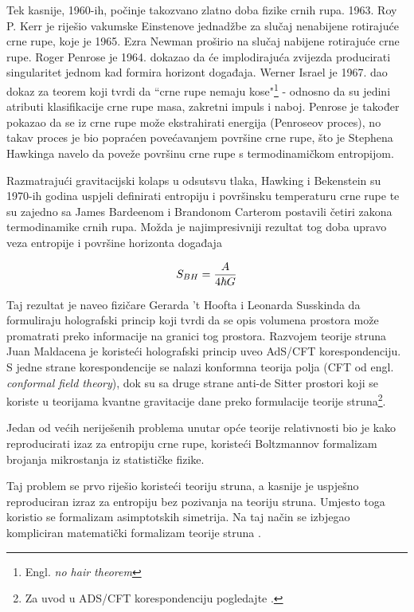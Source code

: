 Tek kasnije, 1960-ih, počinje takozvano zlatno doba fizike crnih rupa. 1963. Roy P. Kerr je riješio vakumske Einstenove jednadžbe za slučaj nenabijene rotirajuće crne rupe, koje je 1965. Ezra Newman proširio na slučaj nabijene rotirajuće crne rupe. Roger Penrose je  1964. dokazao da će implodirajuća zvijezda producirati singularitet jednom kad formira horizont događaja. Werner Israel je 1967. dao dokaz za teorem koji tvrdi da ``crne rupe nemaju kose"\footnote{Engl. \textit{no hair theorem}} - odnosno da su jedini atributi klasifikacije crne rupe masa, zakretni impuls i naboj. Penrose je također pokazao da se iz crne rupe može ekstrahirati energija (Penroseov proces), no takav proces je bio popraćen povećavanjem površine crne rupe, što je Stephena Hawkinga navelo da poveže površinu crne rupe s termodinamičkom entropijom.

Razmatrajući gravitacijski kolaps u odsutsvu tlaka, Hawking i Bekenstein su 1970-ih godina uspjeli definirati entropiju i površinsku temperaturu crne rupe te su zajedno sa James Bardeenom i Brandonom Carterom postavili četiri zakona termodinamike crnih rupa. Možda je najimpresivniji rezultat tog doba upravo veza entropije i površine horizonta događaja

\begin{equation}
S_{BH}=\frac{A}{4\hbar G}
\label{eq:BekensteinHawking}
\medskip
\end{equation}

Taj rezultat je naveo fizičare Gerarda 't Hoofta i Leonarda Susskinda da formuliraju holografski princip koji tvrdi da se opis volumena prostora može promatrati preko informacije na granici tog prostora. Razvojem teorije struna Juan Maldacena je koristeći holografski princip uveo AdS/CFT korespondenciju. S jedne strane korespondencije se nalazi konformna teorija polja (CFT od engl. \textit{conformal field theory}), dok su sa druge strane anti-de Sitter prostori koji se koriste u teorijama kvantne gravitacije dane preko formulacije teorije struna\footnote{Za uvod u ADS/CFT korespondenciju pogledajte \citep{Nastase:2007kj, Ramallo:2013bua}.}.

Jedan od većih neriješenih problema unutar opće teorije relativnosti bio je kako reproducirati izaz za entropiju crne rupe, koristeći Boltzmannov formalizam brojanja mikrostanja iz statističke fizike.

Taj problem se prvo riješio koristeći teoriju struna, a kasnije je uspješno reproduciran izraz za entropiju bez pozivanja na teoriju struna. Umjesto toga koristio se formalizam asimptotskih simetrija. Na taj način se izbjegao kompliciran matematički formalizam teorije struna \citep{Brown:1986nw, Strominger:1997eq}.

